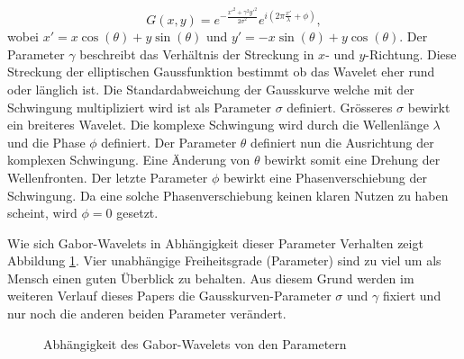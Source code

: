 \begin{equation}
G(x,y)=e^{-\frac{x'^{2}+\gamma^{2}y'^{2}}{2\sigma^{2}}}
e^{i(2\pi\frac{x'}{\lambda} + \phi)},
\end{equation} 
wobei $x'=x\cos(\theta)+y\sin(\theta)$ und $y'=-x\sin(\theta)+y\cos(\theta)$.
Der Parameter $\gamma$ beschreibt das Verhältnis der Streckung in $x$- und $y$-Richtung.
Diese Streckung der elliptischen Gaussfunktion bestimmt ob das Wavelet eher rund oder länglich ist.
Die Standardabweichung der Gausskurve welche mit der Schwingung multipliziert wird ist als Parameter $\sigma$ definiert.
Grösseres $\sigma$ bewirkt ein breiteres Wavelet.
Die komplexe Schwingung wird durch die Wellenlänge $\lambda$ und die Phase $\phi$ definiert.
Der Parameter $\theta$ definiert nun die Ausrichtung der komplexen Schwingung.
Eine Änderung von $\theta$  bewirkt somit eine Drehung der Wellenfronten.
Der letzte Parameter $\phi$ bewirkt eine Phasenverschiebung der Schwingung. 
Da eine solche Phasenverschiebung keinen klaren Nutzen zu haben scheint, wird $\phi=0$ gesetzt.

Wie sich Gabor-Wavelets in Abhängigkeit dieser Parameter Verhalten zeigt Abbildung \ref{fig:kernels}.
Vier unabhängige Freiheitsgrade (Parameter) sind zu viel um als Mensch einen guten Überblick zu behalten.
Aus diesem Grund werden im weiteren Verlauf dieses Papers die Gausskurven-Parameter $\sigma$ und $\gamma$ fixiert und nur noch die anderen beiden Parameter verändert.

\begin{figure}
	\centering
	
	\caption{Abhängigkeit des Gabor-Wavelets von den Parametern}
	\label{fig:kernels}
\end{figure}
